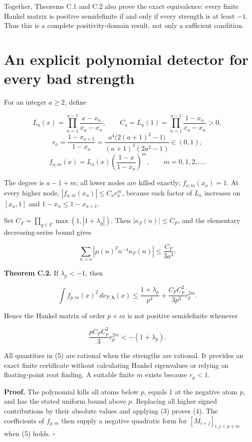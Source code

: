 Together, Theorems C.1 and C.2 also prove the exact equivalence: every
finite Hankel matrix is positive semidefinite if and only if every
strength is at least \(-1\). Thus this is a complete positivity-domain
result, not only a sufficient condition.

\hypertarget{an-explicit-polynomial-detector-for-every-bad-strength}{%
\section{An explicit polynomial detector for every bad
strength}\label{an-explicit-polynomial-detector-for-every-bad-strength}}

For an integer \(a\ge2\), define

\[
L_a(x)=\prod_{n=1}^{a-1}\frac{x-x_n}{x_a-x_n},\qquad
C_a=L_a(1)=\prod_{n=1}^{a-1}\frac{1-x_n}{x_a-x_n}>0,
\] \[
r_a=\frac{1-x_{a+1}}{1-x_a}
=\frac{a^4\bigl(2(a+1)^2-1\bigr)}{(a+1)^4(2a^2-1)}\in(0,1),
\] \[
f_{a,m}(x)=L_a(x)\left(\frac{1-x}{1-x_a}\right)^m,
\qquad m=0,1,2,\ldots.
\tag{2}
\]

The degree is \(a-1+m\); all lower nodes are killed exactly;
\(f_{a,m}(x_a)=1\). At every higher node,
\(|f_{a,m}(x_n)|\le C_a r_a^m\), because each factor of \(L_a\)
increases on \([x_a,1]\) and \(1-x_n\le1-x_{a+1}\).

Set \(C_F=\prod_{q\in F}\max(1,|1+\lambda_q|)\). Then
\(|\kappa_F(n)|\le C_F\), and the elementary decreasing-series bound
gives

\[
\sum_{n>a}|\mu(n)^2n^{-4}\kappa_F(n)|
\le\frac{C_F}{3a^3}.
\tag{3}
\]

\textbf{Theorem C.2.} If \(\lambda_p<-1\), then

\[
\int f_{p,m}(x)^2\,d\nu_{F,\boldsymbol\lambda}(x)
\le\frac{1+\lambda_p}{p^4}
+\frac{C_F C_p^2}{3p^3}r_p^{2m}.
\tag{4}
\]

Hence the Hankel matrix of order \(p+m\) is not positive semidefinite
whenever

\[
\boxed{\frac{p C_F C_p^2}{3}r_p^{2m}<-(1+\lambda_p).}
\tag{5}
\]

All quantities in (5) are rational when the strengths are rational. It
provides an exact finite certificate without calculating Hankel
eigenvalues or relying on floating-point root finding. A suitable finite
\(m\) exists because \(r_p<1\).

\textbf{Proof.} The polynomial kills all atoms below \(p\), equals 1 at
the negative atom \(p\), and has the stated uniform bound above \(p\).
Replacing all higher signed contributions by their absolute values and
applying (3) proves (4). The coefficients of \(f_{p,m}\) then supply a
negative quadratic form for \([M_{i+j}]_{i,j<p+m}\) when (5) holds.
\(\square\)

